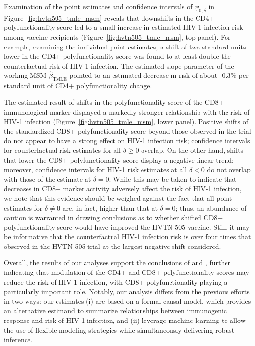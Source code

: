Examination of the point estimates and confidence intervals of $\psi_{0,\delta}$
in Figure~\ref{fig:hvtn505_tmle_msm} reveals that downshifts in the CD4+
polyfunctionality score led to a small increase in estimated HIV-1 infection
risk among vaccine recipients (Figure~\ref{fig:hvtn505_tmle_msm}, top panel).
For example, examining the individual point estimates, a shift of two standard
units lower in the CD4+ polyfunctionality score was found to at least double the
counterfactual risk of HIV-1 infection. The estimated slope parameter of the
working MSM $\hat{\beta}_{\text{TMLE}}$ pointed to an estimated decrease in risk
of about -0.3\% per standard unit of CD4+ polyfunctionality change.

The estimated result of shifts in the polyfunctionality score of the CD8+
immunological marker displayed a markedly stronger relationship with the risk of
HIV-1 infection (Figure~\ref{fig:hvtn505_tmle_msm}, lower panel). Positive
shifts of the standardized CD8+ polyfunctionality score beyond those observed in
the trial do not appear to have a strong effect on HIV-1 infection risk;
confidence intervals for counterfactual risk estimates for all $\delta \geq 0$
overlap. On the other hand, shifts that lower the CD8+ polyfunctionality score
display a negative linear trend; moreover, confidence intervals for HIV-1 risk
estimates at all $\delta < 0$ do not overlap with those of the estimate at
$\delta = 0$. While this may be taken to indicate that decreases in CD8+ marker
activity adversely affect the risk of HIV-1 infection, we note that this
evidence should be weighed against the fact that all point estimates for
$\delta \neq 0$ are, in fact, higher than that at $\delta = 0$; thus, an
abundance of caution is warranted in drawing conclusions as to whether shifted
CD8+ polyfunctionality score would have improved the HVTN 505 vaccine. Still, it
may be informative that the counterfactual HIV-1 infection risk is over four
times that observed in the HVTN 505 trial at the largest negative shift
considered.

Overall, the results of our analyses support the conclusions of
\citet{janes2017higher} and \citet{fong2018modification}, further indicating
that modulation of the CD4+ and CD8+ polyfunctionality scores may reduce the
risk of HIV-1 infection, with CD8+ polyfunctionality playing a particularly
important role. Notably, our analysis differs from the previous efforts in two
ways: our estimates (i) are based on a formal causal model, which provides an
alternative estimand to summarize relationships between immunogenic response and
risk of HIV-1 infection, and (ii) leverage  machine learning to allow the use of
flexible modeling strategies while simultaneously delivering robust inference.

